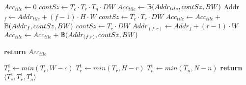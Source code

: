 \begin{algorithm}[H]
\begin{algorithmic}[1]
	 	 \label{alg:FuncTileAccess}
	    \State $Acc_{tile}\gets 0$
	    	\State$contSz\gets T_c\cdot T_r\cdot T_n\cdot DW$\label{alg:TileAccessSingleTxn}
	    	\State$Acc_{tile}{\gets}$$\mathbb{B}({Addr_{tile},contSz,BW})$\label{alg:TileAccessIf1End}
	    \Else
	    	       \State Addr$_{f}{\gets} Addr_{tile}{+}(f{-}1){\cdot}H{\cdot}W$\label{alg:TileAccessFrameAddr}
   					    \State $contSz{\gets}T_c\cdot T_r\cdot DW$
                        \State $Acc_{tile}{\gets}Acc_{tile}+$$\mathbb{B}({Addr_f,contSz,BW})$\label{alg:TileAccess2}
	    	       \Else
	    	           \State $contSz{\gets}T_c{\cdot}DW$
                            \State $Addr_{(f,r)}{\gets}Addr_{f}+(r-1)\cdot W$\label{alg:TileRowAddr}
                            \State $Acc_{tile}{\gets}Acc_{tile}+$$\mathbb{B}({Addr_{(f,r)},contSz,BW})$\label{alg:TileAccessFor2End}
	    	           \EndFor
	    	       \EndIf
	            \EndFor	
	    
	    \EndIf
	    \label{alg:FuncTileAccessEnd}	 	
	 	\State \textbf{return} $Acc_{tile}$
	 	\EndProcedure	
	
	
	 	 \label{alg:FuncTileDimEnd}
	 	\State $T^1_c\gets min(T_c,W-c)$
	 	\State $T^1_r\gets min(T_r,H-r)$
	 	\State $T^1_n\gets min(T_n,N-n)$
	 	\State \textbf{return} ${\langle T^1_c,T^1_r,T^1_n\rangle}$
	 	\EndProcedure

	\end{algorithmic}
\end{algorithm}